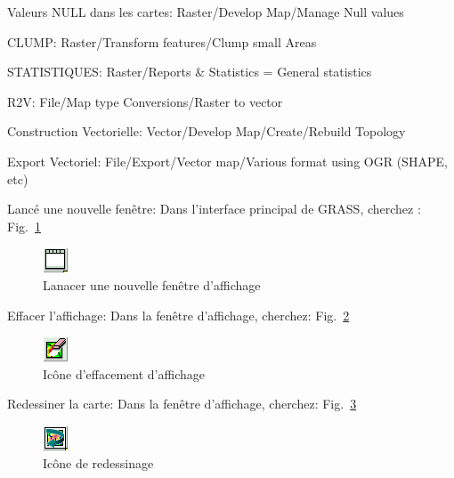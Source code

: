 Valeurs NULL dans les cartes: Raster/Develop Map/Manage Null values

CLUMP: Raster/Transform features/Clump small Areas

STATISTIQUES: Raster/Reports \& Statistics = General statistics

R2V: File/Map type Conversions/Raster to vector

Construction Vectorielle: Vector/Develop Map/Create/Rebuild Topology

Export Vectoriel: File/Export/Vector map/Various format using OGR (SHAPE, etc)

Lanc\'e une nouvelle fen\^etre:
Dans l'interface principal de GRASS, cherchez :    Fig.~\ref{fig:grass018}

\begin{figure}[htbp]
   \centering
   \includegraphics[scale=1]{grass018.png}
   \caption{Lanacer une nouvelle fen\^etre d'affichage}
   \label{fig:grass018}
\end{figure}

Effacer l'affichage:
Dans la fen\^etre d'affichage, cherchez:   Fig.~\ref{fig:grass019}

\begin{figure}[htbp]
   \centering
   \includegraphics[scale=1]{grass019.png}
   \caption{Ic\^one d'effacement d'affichage}
   \label{fig:grass019}
\end{figure}

Redessiner la carte:
Dans la fen\^etre d'affichage, cherchez:   Fig.~\ref{fig:grass020}

\begin{figure}[htbp]
   \centering
   \includegraphics[scale=1]{grass020.png}
   \caption{Ic\^one de redessinage}
   \label{fig:grass020}
\end{figure}

